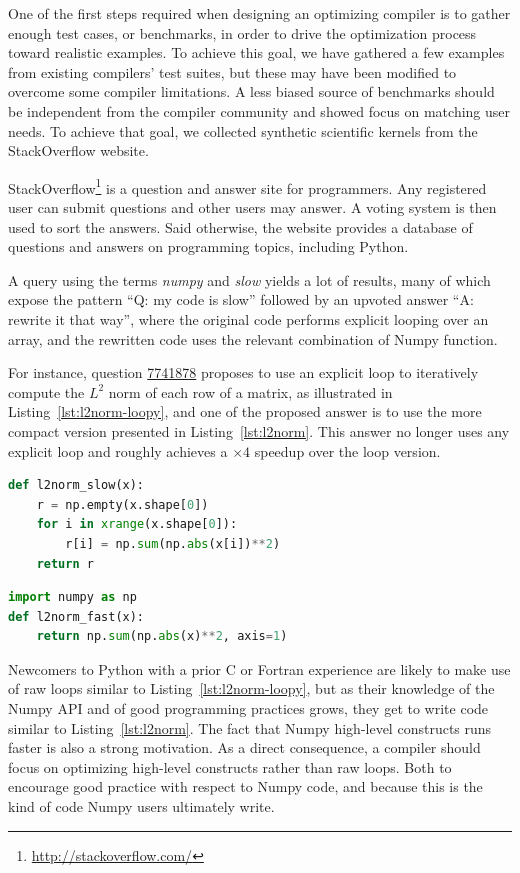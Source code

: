\documentclass[10pt, preprint]{sigplanconf}
\begin{document}
One of the first steps required when designing an optimizing compiler is to
gather enough test cases, or benchmarks, in order to drive the optimization
process toward realistic examples. To achieve this goal, we have gathered a few
examples from existing compilers' test suites, but these may have been modified to
overcome some compiler limitations. A less biased source of benchmarks should
be independent from the compiler community and showed focus on matching user needs.
To achieve that goal, we collected synthetic scientific kernels from the
StackOverflow website.

StackOverflow\footnote{\url{http://stackoverflow.com/}} is a question and
answer site for programmers. Any registered user can submit questions and other
users may answer. A voting system is then used to sort the answers. Said
otherwise, the website provides a database of questions and answers on
programming topics, including Python.

A query using the terms \emph{numpy} and \emph{slow} yields a lot of results, many
of which expose the pattern ``Q: my code is slow'' followed by an upvoted answer
``A: rewrite it that way'', where the original code performs explicit looping
over an array, and the rewritten code uses the relevant combination of Numpy
function.

For instance, question \href{http://stackoverflow.com/questions/7741878}{7741878}
proposes to use an explicit loop to iteratively compute the $L^2$ norm of each
row of a matrix, as illustrated in Listing~\ref{lst:l2norm-loopy}, and one of
the proposed answer is to use the more compact version presented in
Listing~\ref{lst:l2norm}. This answer no longer uses any explicit loop and
roughly achieves a $\times 4$ speedup over the loop version.

\begin{lstlisting}[language=python,caption={Per row version of $L^2$ norm with loop in Numpy.}, label={lst:l2norm-loopy}]
def l2norm_slow(x):
    r = np.empty(x.shape[0])
    for i in xrange(x.shape[0]):
        r[i] = np.sum(np.abs(x[i])**2)
    return r
\end{lstlisting}

\begin{lstlisting}[language=python,caption={Per row version of $L^2$ norm without loop in Numpy.}, label={lst:l2norm}]
import numpy as np
def l2norm_fast(x):
    return np.sum(np.abs(x)**2, axis=1)
\end{lstlisting}

Newcomers to Python with a prior C or Fortran experience are likely to make
use of raw loops similar to Listing~\ref{lst:l2norm-loopy}, but as their
knowledge of the Numpy API and of good programming practices grows, they get to 
write code similar to Listing~\ref{lst:l2norm}. 
The fact that Numpy high-level constructs runs faster is also a strong 
motivation. As a direct consequence, a compiler should focus on optimizing
high-level constructs rather than raw
loops. Both to encourage good practice with respect to Numpy code, and because
this is the kind of code Numpy users ultimately write.
\end{document}

